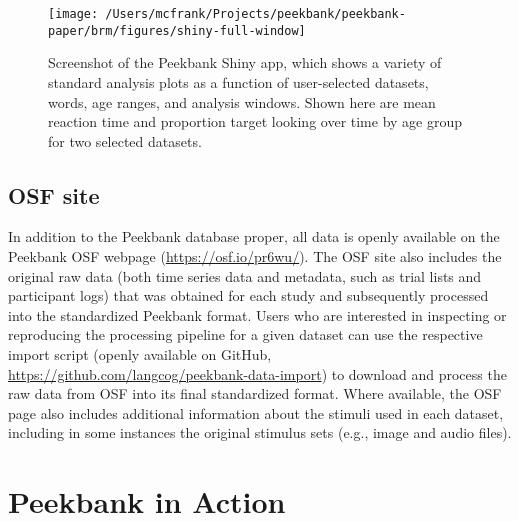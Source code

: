 \documentclass[
  english,
  man,floatsintext]{apa6}
\begin{document}
\begin{figure}

{\centering \texttt{[image: /Users/mcfrank/Projects/peekbank/peekbank-paper/brm/figures/shiny-full-window]} 

}

\caption{Screenshot of the Peekbank Shiny app, which shows a variety of standard analysis plots as a function of user-selected datasets, words, age ranges, and analysis windows. Shown here are mean reaction time and proportion target looking over time by age group for two selected datasets.}\label{fig:shiny}
\end{figure}

\hypertarget{osf-site}{%
\subsection{OSF site}\label{osf-site}}

In addition to the Peekbank database proper, all data is openly available on the Peekbank OSF webpage (\url{https://osf.io/pr6wu/}).
The OSF site also includes the original raw data (both time series data and metadata, such as trial lists and participant logs) that was obtained for each study and subsequently processed into the standardized Peekbank format.
Users who are interested in inspecting or reproducing the processing pipeline for a given dataset can use the respective import script (openly available on GitHub, \url{https://github.com/langcog/peekbank-data-import}) to download and process the raw data from OSF into its final standardized format.
Where available, the OSF page also includes additional information about the stimuli used in each dataset, including in some instances the original stimulus sets (e.g., image and audio files).

\hypertarget{peekbank-in-action}{%
\section{Peekbank in Action}\label{peekbank-in-action}}
\end{document}
